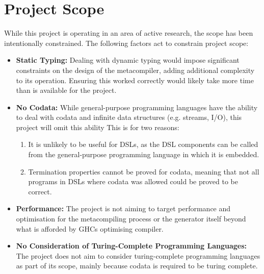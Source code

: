 \documentclass[a4paper,11pt]{report}
\begin{document}
\section{Project Scope} %
\label{sec:project_scope}
While this project is operating in an area of active research, the scope has been intentionally constrained.
The following factors act to constrain project scope:
\begin{itemize}
    \item \textbf{Static Typing:} Dealing with dynamic typing would impose significant constraints on the design of the metacompiler, adding additional complexity to its operation.
    Ensuring this worked correctly would likely take more time than is available for the project.
    \item \textbf{No Codata:} While general-purpose programming languages have the ability to deal with codata and infinite data structures (e.g. streams, I/O), this project will omit this ability
    This is for two reasons:
    \begin{enumerate}
        \item It is unlikely to be useful for DSLs, as the DSL components can be called from the general-purpose programming language in which it is embedded.
        \item Termination properties cannot be proved for codata, meaning that not all programs in DSLs where codata was allowed could be proved to be correct.
    \end{enumerate}
    \item \textbf{Performance:} The project is not aiming to target performance and optimisation for the metacompiling process or the generator itself beyond what is afforded by GHCs optimising compiler.
    \item \textbf{No Consideration of Turing-Complete Programming Languages:} The project does not aim to consider turing-complete programming languages as part of its scope, mainly because codata is required to be turing complete.
\end{itemize}




\end{document}
